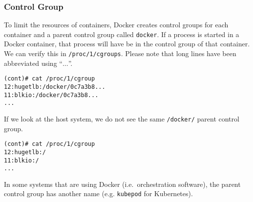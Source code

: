 \subsubsection{Control Group}
To limit the resources of containers, Docker creates control groups for each container and a parent control group called \lstinline{docker}. If a process is started in a Docker container, that process will have be in the control group of that container. We can verify this in \lstinline{/proc/1/cgroups}\cite{Metasploit-Linux-Gather-Container-Detection}. Please note that long lines have been abbreviated using ``$\ldots$''.

\begin{lstlisting}[caption={Process control group inside container},captionpos=b]
(cont)# cat /proc/1/cgroup
12:hugetlb:/docker/0c7a3b8...
11:blkio:/docker/0c7a3b8...
...
\end{lstlisting}

If we look at the host system, we do not see the same \lstinline{/docker/} parent control group.

\begin{lstlisting}[caption={Process control groups on host},captionpos=b]
(cont)# cat /proc/1/cgroup
12:hugetlb:/
11:blkio:/
...
\end{lstlisting}

\hfill

In some systems that are using Docker (i.e.\ orchestration software), the parent control group has another name (e.g. \lstinline{kubepod} for Kubernetes).
